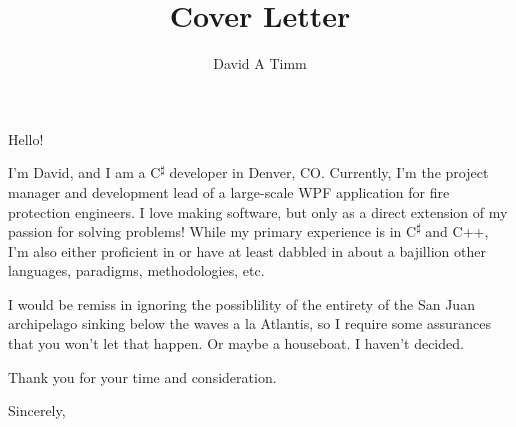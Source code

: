 \documentclass[letterpaper,12pt]{letter}
\author{David A Timm}
\title{Cover Letter}
\begin{document}
Hello!

I'm David, and I am a C\textsuperscript{{$\sharp$}} developer in Denver, CO.
Currently, I'm the project manager and development lead of a large-scale
WPF application for fire protection engineers. I love making software, but
only as a direct extension of my passion for solving problems! While my
primary experience is in C\textsuperscript{{$\sharp$}} and C++, I'm also either
proficient in or have at least dabbled in about a bajillion other languages,
paradigms, methodologies, etc.

I would be remiss in ignoring the possiblility of the entirety of the San Juan
archipelago sinking below the waves a la Atlantis, so I require some assurances
that you won't let that happen. Or maybe a houseboat. I haven't decided.

Thank you for your time and consideration.

\vspace{2\parskip}
\closing{Sincerely,}
\end{document}
